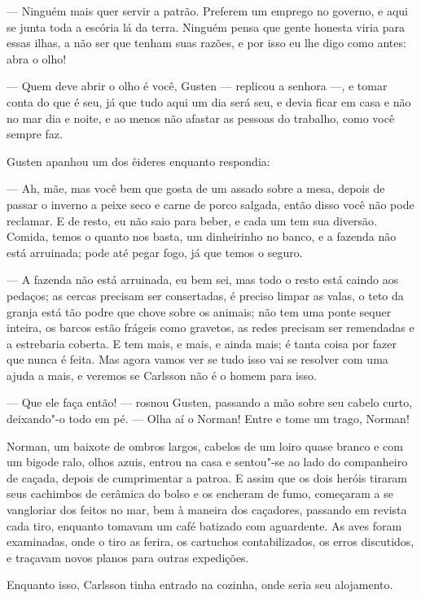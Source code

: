 --- Ninguém mais quer servir a patrão. Preferem um emprego no
governo, e aqui se junta toda a escória lá da terra. Ninguém pensa que gente
honesta viria para essas ilhas, a não ser que tenham suas razões, e por isso
eu lhe digo como antes: abra o olho!

--- Quem deve abrir o olho é você, Gusten --- replicou a senhora ---, e tomar conta
do que é seu, já que tudo aqui um dia será seu, e devia ficar em casa e não no
mar dia e noite, e ao menos não afastar as pessoas do trabalho, como você sempre
faz.

Gusten apanhou um dos êideres enquanto respondia:

--- Ah, mãe, mas você bem que gosta de um assado sobre a mesa, depois de passar o
inverno a peixe seco e carne de porco salgada, então disso você não pode
reclamar. E de resto, eu não saio para beber, e cada um tem sua diversão. Comida,
temos o quanto nos basta, um dinheirinho no banco, e a fazenda não está
arruinada; pode até pegar fogo, já que temos o seguro.

--- A fazenda não está arruinada, eu bem sei, mas todo o resto está caindo aos
pedaços; as cercas precisam ser consertadas, é preciso limpar as valas, o teto da granja
está tão podre que chove sobre os animais; não tem uma ponte sequer inteira,
os barcos estão frágeis como gravetos, as redes precisam ser remendadas e a
estrebaria coberta. E tem mais, e mais, e ainda mais; é tanta coisa por fazer que
nunca é feita. Mas agora vamos ver se tudo isso vai se resolver com  
uma ajuda a mais, e veremos se Carlsson não é o homem para isso.

--- Que ele faça então! --- rosnou Gusten, passando a mão sobre seu cabelo
curto, deixando"-o todo em pé. --- Olha aí o Norman! Entre e tome um trago, Norman!

Norman, um baixote de ombros largos, cabelos de um loiro quase branco e com um
bigode ralo, olhos azuis, entrou na casa e sentou"-se ao lado do companheiro de
caçada, depois de cumprimentar a patroa. E assim que os dois heróis tiraram seus
cachimbos de cerâmica do bolso e os encheram de fumo, começaram a se vangloriar
dos feitos no mar, bem à maneira dos caçadores, passando em revista cada tiro,
enquanto tomavam um café batizado com aguardente. As aves foram examinadas, 
onde o tiro as ferira, os cartuchos contabilizados, os erros discutidos, e 
traçavam novos planos para outras expedições.

Enquanto isso, Carlsson tinha entrado na cozinha, onde seria seu alojamento.

